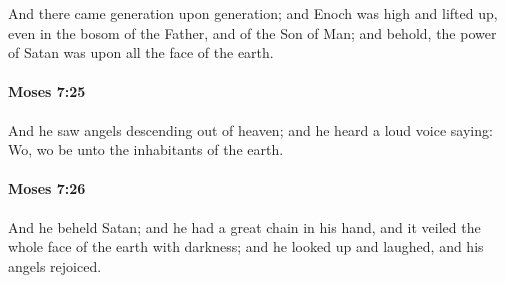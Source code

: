 			And there came generation upon generation; and Enoch was high and lifted up, even in the bosom of the Father, and of the Son of Man; and behold, the power of Satan was upon all the face of the earth.


		\paragraph{Moses 7:25} %
			\label{MOSES-7-25}

			And he saw angels descending out of heaven; and he heard a loud voice saying: Wo, wo be unto the inhabitants of the earth.


		\paragraph{Moses 7:26} %
			\label{MOSES-7-26}

			And he beheld Satan; and he had a great chain in his hand, and it veiled the whole face of the earth with darkness;	and he looked up and laughed, and his angels rejoiced.


